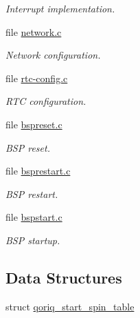 \begin{DoxyCompactItemize}
\begin{DoxyCompactList}\small\item\em Interrupt implementation. \end{DoxyCompactList}\item 
file \mbox{\hyperlink{powerpc_2qoriq_2net_2network_8c}{network.\+c}}
\begin{DoxyCompactList}\small\item\em Network configuration. \end{DoxyCompactList}\item 
file \mbox{\hyperlink{powerpc_2qoriq_2rtc_2rtc-config_8c}{rtc-\/config.\+c}}
\begin{DoxyCompactList}\small\item\em R\+TC configuration. \end{DoxyCompactList}\item 
file \mbox{\hyperlink{powerpc_2qoriq_2start_2bspreset_8c}{bspreset.\+c}}
\begin{DoxyCompactList}\small\item\em B\+SP reset. \end{DoxyCompactList}\item 
file \mbox{\hyperlink{qoriq_2start_2bsprestart_8c}{bsprestart.\+c}}
\begin{DoxyCompactList}\small\item\em B\+SP restart. \end{DoxyCompactList}\item 
file \mbox{\hyperlink{powerpc_2qoriq_2start_2bspstart_8c}{bspstart.\+c}}
\begin{DoxyCompactList}\small\item\em B\+SP startup. \end{DoxyCompactList}\end{DoxyCompactItemize}
\subsection*{Data Structures}
\begin{DoxyCompactItemize}
\item 
struct \mbox{\hyperlink{structqoriq__start__spin__table}{qoriq\+\_\+start\+\_\+spin\+\_\+table}}
\end{DoxyCompactItemize}
